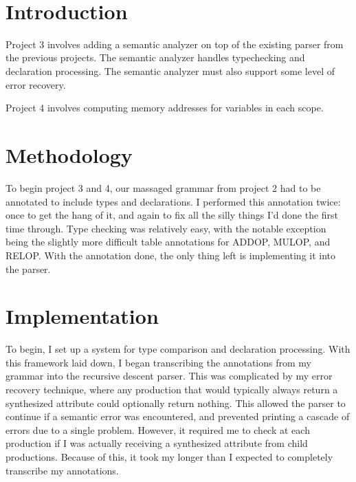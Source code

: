 \documentclass[paper=letter, fontsize=11pt, oneside, titlepage]{scrartcl}
\title{
\vspace{1.8 in} \normalfont \normalsize 
\textsc{\pschool} \\ [25pt] %
\horrule{0.5pt} \\[0.4cm] %
\huge \ptitle \\ %
\horrule{0.5pt} \\[0.5cm] %
}
\author{\pauthor} %
\date{
    \normalsize
    \pteacher \endgraf
    \pclass \endgraf
    \pdate
} %
\begin{document}

\maketitle

\section{Introduction}\label{intro}

Project 3 involves adding a semantic analyzer on top of the existing parser from the previous projects.  The semantic analyzer handles typechecking and declaration processing.  The semantic analyzer must also support some level of error recovery.  

Project 4 involves computing memory addresses for variables in each scope.

\section{Methodology}\label{meth}

To begin project 3 and 4, our massaged grammar from project 2 had to be annotated to include types and declarations.  I performed this annotation twice: once to get the hang of it, and again to fix all the silly things I'd done the first time through.  Type checking was relatively easy, with the notable exception being the slightly more difficult table annotations for ADDOP, MULOP, and RELOP.  With the annotation done, the only thing left is implementing it into the parser. 

\section{Implementation}\label{impl}

To begin, I set up a system for type comparison and declaration processing.  With this framework laid down, I began transcribing the annotations from my grammar into the recursive descent parser.  This was complicated by my error recovery technique, where any production that would typically always return a synthesized attribute could optionally return nothing.  This allowed the parser to continue if a semantic error was encountered, and prevented printing a cascade of errors due to a single problem.  However, it required me to check at each production if I was actually receiving a synthesized attribute from child productions.  Because of this, it took my longer than I expected to completely transcribe my annotations.  
\end{document}
